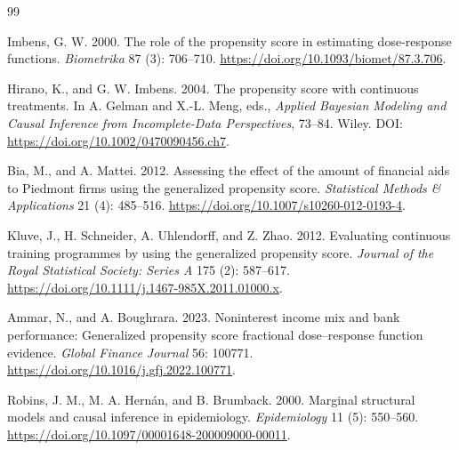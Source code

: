 \documentclass[11pt]{article}
\begin{document}
\begin{thebibliography}{99}

Imbens, G. W. 2000. The role of the propensity score in estimating dose-response functions. \textit{Biometrika} 87 (3): 706--710. \url{https://doi.org/10.1093/biomet/87.3.706}.

Hirano, K., and G. W. Imbens. 2004. The propensity score with continuous treatments. In A. Gelman and X.-L. Meng, eds., \textit{Applied Bayesian Modeling and Causal Inference from Incomplete-Data Perspectives}, 73--84. Wiley. DOI: \url{https://doi.org/10.1002/0470090456.ch7}.

Bia, M., and A. Mattei. 2012. Assessing the effect of the amount of financial aids to Piedmont firms using the generalized propensity score. \textit{Statistical Methods \& Applications} 21 (4): 485--516. \url{https://doi.org/10.1007/s10260-012-0193-4}.

Kluve, J., H. Schneider, A. Uhlendorff, and Z. Zhao. 2012. Evaluating continuous training programmes by using the generalized propensity score. \textit{Journal of the Royal Statistical Society: Series A} 175 (2): 587--617. \url{https://doi.org/10.1111/j.1467-985X.2011.01000.x}.

Ammar, N., and A. Boughrara. 2023. Noninterest income mix and bank performance: Generalized propensity score fractional dose--response function evidence. \textit{Global Finance Journal} 56: 100771. \url{https://doi.org/10.1016/j.gfj.2022.100771}.

Robins, J. M., M. A. Hern\'an, and B. Brumback. 2000. Marginal structural models and causal inference in epidemiology. \textit{Epidemiology} 11 (5): 550--560. \url{https://doi.org/10.1097/00001648-200009000-00011}.

\end{thebibliography}
\end{document}
